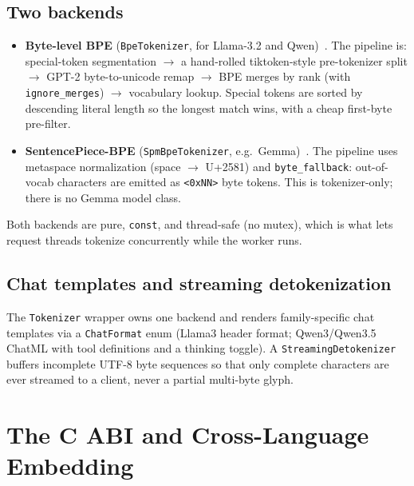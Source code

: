 \documentclass[11pt,a4paper]{report}
\newcommand{\code}[1]{\texttt{#1}}
\begin{document}
\section{Two backends}
\begin{itemize}[nosep]
  \item \textbf{Byte-level BPE} (\code{BpeTokenizer}, for Llama-3.2 and
        Qwen)~\citep{sennrich2016bpe,radford2019gpt2}. The pipeline is:
        special-token segmentation $\to$ a hand-rolled tiktoken-style
        pre-tokenizer split $\to$ GPT-2 byte-to-unicode remap $\to$ BPE merges by
        rank (with \code{ignore\_merges}) $\to$ vocabulary lookup. Special tokens
        are sorted by descending literal length so the longest match wins, with a
        cheap first-byte pre-filter.
  \item \textbf{SentencePiece-BPE} (\code{SpmBpeTokenizer}, e.g.\
        Gemma)~\citep{kudo2018sentencepiece}. The pipeline uses metaspace
        normalization (space $\to$ U+2581) and \code{byte\_fallback}: out-of-vocab
        characters are emitted as \code{<0xNN>} byte tokens. This is tokenizer-only;
        there is no Gemma model class.
\end{itemize}
Both backends are pure, \code{const}, and thread-safe (no mutex), which is what lets
request threads tokenize concurrently while the worker runs.

\section{Chat templates and streaming detokenization}
The \code{Tokenizer} wrapper owns one backend and renders family-specific chat
templates via a \code{ChatFormat} enum (Llama3 header format; Qwen3/Qwen3.5 ChatML
with tool definitions and a thinking toggle). A \code{StreamingDetokenizer} buffers
incomplete UTF-8 byte sequences so that only complete characters are ever streamed
to a client, never a partial multi-byte glyph.

\chapter{The C ABI and Cross-Language Embedding}
\label{ch:abi}
\end{document}
